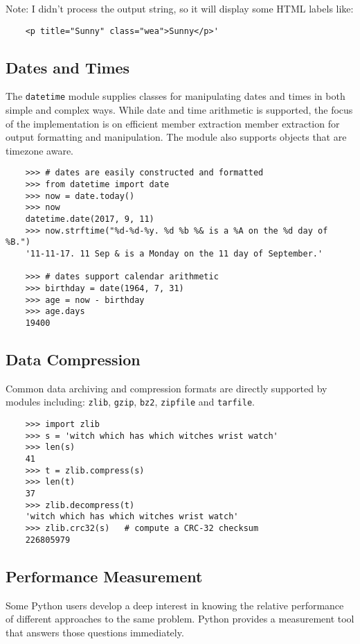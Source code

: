 \documentclass[UTF8]{article}
\begin{document}
Note: I didn't process the output string, so it will display some HTML labels like:
\begin{verbatim}
    <p title="Sunny" class="wea">Sunny</p>'
\end{verbatim}

\subsection{Dates and Times}
The \texttt{datetime} module supplies classes for manipulating dates and times in both simple and
complex ways. While date and time arithmetic is supported, the focus of the implementation is on
efficient member extraction member extraction for output formatting and manipulation. The module
also supports objects that are timezone aware.
\begin{verbatim}
    >>> # dates are easily constructed and formatted
    >>> from datetime import date
    >>> now = date.today()
    >>> now
    datetime.date(2017, 9, 11)
    >>> now.strftime("%d-%d-%y. %d %b %& is a %A on the %d day of %B.")
    '11-11-17. 11 Sep & is a Monday on the 11 day of September.'

    >>> # dates support calendar arithmetic
    >>> birthday = date(1964, 7, 31)
    >>> age = now - birthday
    >>> age.days
    19400
\end{verbatim}

\subsection{Data Compression}
Common data archiving and compression formats are directly supported by modules including:
\texttt{zlib}, \texttt{gzip}, \texttt{bz2}, \texttt{zipfile} and \texttt{tarfile}.
\begin{verbatim}
    >>> import zlib
    >>> s = 'witch which has which witches wrist watch'
    >>> len(s)
    41
    >>> t = zlib.compress(s)
    >>> len(t)
    37
    >>> zlib.decompress(t)
    'witch which has which witches wrist watch'
    >>> zlib.crc32(s)   # compute a CRC-32 checksum
    226805979
\end{verbatim}

\subsection{Performance Measurement}
Some Python users develop a deep interest in knowing the relative performance of different
approaches to the same problem. Python provides a measurement tool that answers those questions
immediately.
\end{document}
